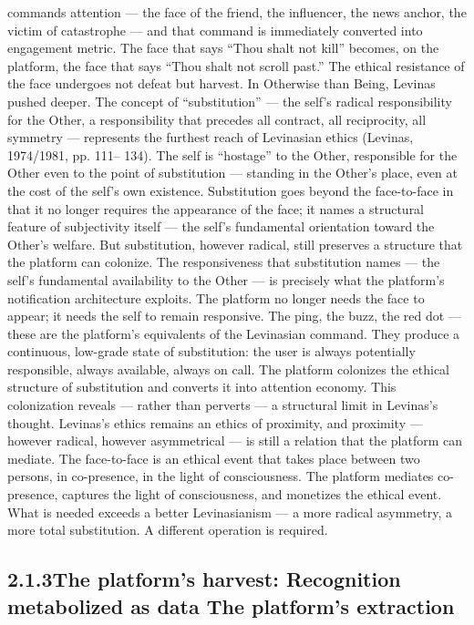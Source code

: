 commands attention — the face of the friend, the influencer, the news anchor, the victim of catastrophe — and that command is immediately converted into engagement metric. The face that says “Thou shalt not kill” becomes, on the platform, the face that says “Thou shalt not scroll past.” The ethical resistance of the face undergoes not defeat but harvest. In Otherwise than Being, Levinas pushed deeper. The concept of “substitution” — the self’s radical responsibility for the Other, a responsibility that precedes all contract, all reciprocity, all symmetry — represents the furthest reach of Levinasian ethics (Levinas, 1974/1981, pp. 111– 134). The self is “hostage” to the Other, responsible for the Other even to the point of substitution — standing in the Other’s place, even at the cost of the self’s own existence. Substitution goes beyond the face-to-face in that it no longer requires the appearance of the face; it names a structural feature of subjectivity itself — the self’s fundamental orientation toward the Other’s welfare. But substitution, however radical, still preserves a structure that the platform can colonize. The responsiveness that substitution names — the self’s fundamental availability to the Other — is precisely what the platform’s notification architecture exploits. The platform no longer needs the face to appear; it needs the self to remain responsive. The ping, the buzz, the red dot — these are the platform’s equivalents of the Levinasian command. They produce a continuous, low-grade state of substitution: the user is always potentially responsible, always available, always on call. The platform colonizes the ethical structure of substitution and converts it into attention economy. This colonization reveals — rather than perverts — a structural limit in Levinas’s thought. Levinas’s ethics remains an ethics of proximity, and proximity — however radical, however asymmetrical — is still a relation that the platform can mediate. The face-to-face is an ethical event that takes place between two persons, in co-presence, in the light of consciousness. The platform mediates co-presence, captures the light of consciousness, and monetizes the ethical event. What is needed exceeds a better Levinasianism — a more radical asymmetry, a more total substitution. A different operation is required.

\subsection{2.1.3\quad The platform’s harvest: Recognition metabolized as data The platform’s extraction}

